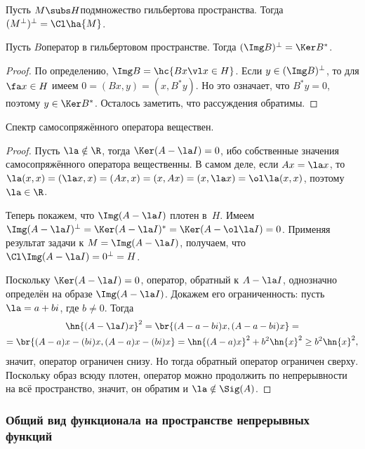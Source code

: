 \documentclass[a4paper]{article}
\begin{document}
\begin{problem}
Пусть $M \subs H$\т подмножество гильбертова пространства. Тогда $(M^\bot)^\bot = \Cl\ha{M}$.
\end{problem}

\begin{stm}
Пусть $B$\т оператор в гильбертовом пространстве. Тогда $(\Img B)^\bot = \Ker B^*$.
\end{stm}
\begin{proof}
По определению, $\Img B = \hc{Bx \vl x \in H}$. Если $y \in (\Img B)^\bot$, то
для $\fa x \in H$ имеем $0 = (Bx,y) = (x, B^*y)$. Но это означает, что $B^*y = 0$,
поэтому $y\in \Ker B^*$. Осталось заметить, что рассуждения обратимы.
\end{proof}

\begin{stm}
Спектр самосопряжённого оператора веществен.
\end{stm}
\begin{proof}
Пусть $\la \notin\R$, тогда $\Ker(A-\la I) = 0$, ибо собственные значения
самосопряжённого оператора вещественны. В самом деле, если $Ax = \la x$,
то $\la(x,x) = (\la x, x)=(Ax,x) = (x,Ax) = (x,\la x) = \ol\la(x,x)$, поэтому
$\la \in \R$.

Теперь покажем, что $\Img (A-\la I)$ плотен в~$H$.
Имеем $\Img(A - \la I)^\bot = \Ker(A - \la I)^* = \Ker(A - \ol \la I) = 0$.
Применяя результат задачи к $M = \Img(A - \la I)$, получаем, что $\Cl \Img(A - \la I) = 0^\bot = H$.

Поскольку $\Ker (A-\la I) = 0$, оператор, обратный к $A - \la I$, однозначно определён на образе $\Img (A-\la I)$.
Докажем его ограниченность: пусть $\la = a + bi$, где $b \neq 0$. Тогда
\begin{multline*}
\hn{(A - \la I)x}^2 = \br{ (A - a - bi)x, (A - a - bi)x} =\\=
\br{ (A-a)x - (b i)x, (A - a)x - (b i)x} = \hn{(A-a)x}^2 + b^2\hn{x}^2 \ge b^2 \hn{x}^2,
\end{multline*}
значит, оператор ограничен снизу. Но тогда обратный оператор ограничен сверху.
Поскольку образ всюду плотен, оператор можно продолжить по непрерывности на всё пространство,
значит, он обратим и $\la \notin \Sig(A)$.
\end{proof}


\subsubsection{Общий вид функционала на пространстве непрерывных функций}
\end{document}
